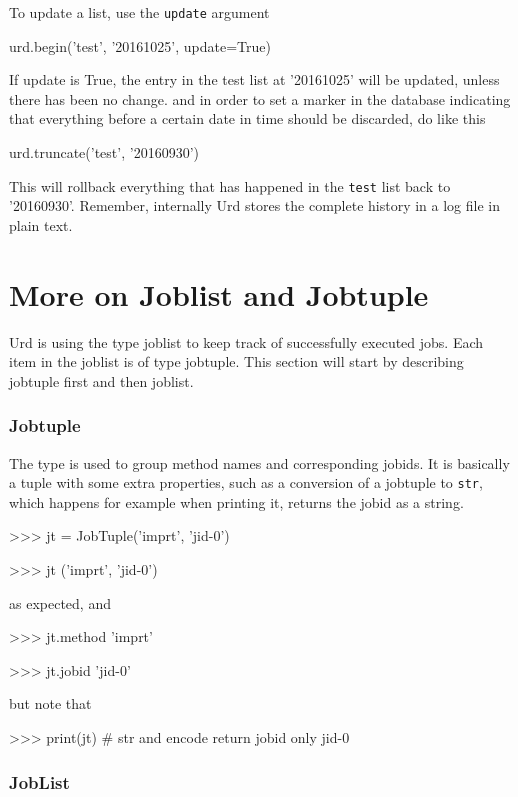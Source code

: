 To update a list, use the \texttt{update} argument
\begin{python}
urd.begin('test', '20161025', update=True)
\end{python}
If update is True, the entry in the test list at '20161025' will be
updated, unless there has been no change.  and in order to set a
marker in the database indicating that everything before a certain
date in time should be discarded, do like this
\begin{python}
urd.truncate('test', '20160930')
\end{python}
This will rollback everything that has happened in the \texttt{test}
list back to '20160930'.  Remember, internally Urd stores the complete
history in a log file in plain text.


\section{More on Joblist and Jobtuple}

Urd is using the type joblist to keep track of successfully executed
jobs.  Each item in the joblist is of type jobtuple.  This section
will start by describing jobtuple first and then joblist.

\subsubsection{Jobtuple}

The \jobtuple type is used to group method names and corresponding
jobids.  It is basically a tuple with some extra properties, such as a
conversion of a jobtuple to \texttt{str}, which happens for example
when printing it, returns the jobid as a string.

\begin{python}
>>> jt = JobTuple('imprt', 'jid-0')

>>> jt
('imprt', 'jid-0')
\end{python}
as expected, and

\begin{python}
>>> jt.method
'imprt'

>>> jt.jobid
'jid-0'
\end{python}
but note that

\begin{python}
>>> print(jt)  # str and encode return jobid only
jid-0
\end{python}



\subsubsection{JobList}

